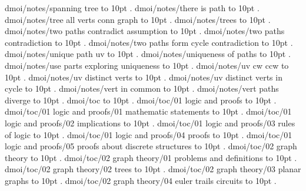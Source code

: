 \smallskip
dmoi/notes/spanning tree \leaders\hbox to 10pt {\hss.\hss}  \hfill {}
\smallskip
dmoi/notes/there is path \leaders\hbox to 10pt {\hss.\hss}  \hfill {}
\smallskip
dmoi/notes/tree all verts conn graph \leaders\hbox to 10pt {\hss.\hss}  \hfill {}
\smallskip
dmoi/notes/trees \leaders\hbox to 10pt {\hss.\hss}  \hfill {}
\smallskip
dmoi/notes/two paths contradict assumption \leaders\hbox to 10pt {\hss.\hss}  \hfill {}
\smallskip
dmoi/notes/two paths contradiction \leaders\hbox to 10pt {\hss.\hss}  \hfill {}
\smallskip
dmoi/notes/two paths form cycle contradiction \leaders\hbox to 10pt {\hss.\hss}  \hfill {}
\smallskip
dmoi/notes/unique path uv \leaders\hbox to 10pt {\hss.\hss}  \hfill {}
\smallskip
dmoi/notes/uniqueness of paths \leaders\hbox to 10pt {\hss.\hss}  \hfill {}
\smallskip
dmoi/notes/use parts exploring uniqueness \leaders\hbox to 10pt {\hss.\hss}  \hfill {}
\smallskip
dmoi/notes/uv cw ccw \leaders\hbox to 10pt {\hss.\hss}  \hfill {}
\smallskip
dmoi/notes/uv distinct verts \leaders\hbox to 10pt {\hss.\hss}  \hfill {}
\smallskip
dmoi/notes/uv distinct verts in cycle \leaders\hbox to 10pt {\hss.\hss}  \hfill {}
\smallskip
dmoi/notes/vert in common \leaders\hbox to 10pt {\hss.\hss}  \hfill {}
\smallskip
dmoi/notes/vert paths diverge \leaders\hbox to 10pt {\hss.\hss}  \hfill {}
\smallskip
dmoi/toc \leaders\hbox to 10pt {\hss.\hss}  \hfill {}
\smallskip
dmoi/toc/01 logic and proofs \leaders\hbox to 10pt {\hss.\hss}  \hfill {}
\smallskip
dmoi/toc/01 logic and proofs/01 mathematic statements \leaders\hbox to 10pt {\hss.\hss}  \hfill {}
\smallskip
dmoi/toc/01 logic and proofs/02 implications \leaders\hbox to 10pt {\hss.\hss}  \hfill {}
\smallskip
dmoi/toc/01 logic and proofs/03 rules of logic \leaders\hbox to 10pt {\hss.\hss}  \hfill {}
\smallskip
dmoi/toc/01 logic and proofs/04 proofs \leaders\hbox to 10pt {\hss.\hss}  \hfill {}
\smallskip
dmoi/toc/01 logic and proofs/05 proofs about discrete structures \leaders\hbox to 10pt {\hss.\hss}  \hfill {}
\smallskip
dmoi/toc/02 graph theory \leaders\hbox to 10pt {\hss.\hss}  \hfill {}
\smallskip
dmoi/toc/02 graph theory/01 problems and definitions \leaders\hbox to 10pt {\hss.\hss}  \hfill {}
\smallskip
dmoi/toc/02 graph theory/02 trees \leaders\hbox to 10pt {\hss.\hss}  \hfill {}
\smallskip
dmoi/toc/02 graph theory/03 planar graphs \leaders\hbox to 10pt {\hss.\hss}  \hfill {}
\smallskip
dmoi/toc/02 graph theory/04 euler trails circuits \leaders\hbox to 10pt {\hss.\hss}  \hfill {}
